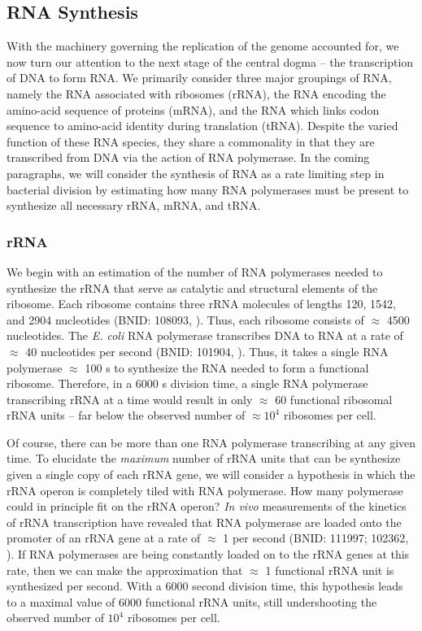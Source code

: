 \subsection{RNA Synthesis}
With the machinery governing the replication of the genome accounted for, we
now turn our attention to the next stage of the central dogma -- the
transcription of DNA to form RNA. We primarily consider three major groupings
of RNA, namely the RNA associated with ribosomes (rRNA), the RNA encoding the
amino-acid sequence of proteins (mRNA), and the RNA which links codon
sequence to amino-acid identity during translation (tRNA). Despite the varied
function of these RNA species, they share a commonality in that they are
transcribed from DNA via the action of RNA polymerase. In the coming
paragraphs, we will consider the synthesis of RNA as a rate limiting step in
bacterial division by estimating how many RNA polymerases must be present to
synthesize all necessary rRNA, mRNA, and tRNA.

\subsubsection{rRNA}
We begin with an estimation of the number of RNA polymerases needed to
synthesize the rRNA that serve as catalytic and structural elements of the
ribosome. Each ribosome contains three rRNA molecules of lengths 120, 1542,
and 2904 nucleotides (BNID: 108093, \cite{milo2010}). Thus, each ribosome
consists of $\approx$ 4500 nucleotides. The \textit{E. coli} RNA polymerase
transcribes DNA to RNA at a rate of $\approx$ 40 nucleotides per second
(BNID: 101904, \cite{milo2010}). Thus, it takes a single RNA polymerase
$\approx$ 100 s to synthesize the RNA needed to form a functional ribosome.
Therefore, in a 6000 s division time, a single RNA polymerase transcribing
rRNA at a time would result in only $\approx$ 60 functional ribosomal rRNA
units -- far below the observed number of $\approx 10^4$ ribosomes per cell.

Of course, there can be more than one RNA polymerase transcribing at any
given time. To elucidate the \textit{maximum} number of rRNA units that can
be synthesize given a single copy of each rRNA gene, we will consider a
hypothesis in which the rRNA operon is completely tiled with RNA polymerase.
How many polymerase could in principle fit on the rRNA operon? \textit{In
vivo} measurements of the kinetics of rRNA transcription have revealed that
RNA polymerase are loaded onto the promoter of an rRNA gene at a rate of
$\approx$ 1 per second (BNID: 111997; 102362, \cite{milo2010}). If RNA
polymerases are being constantly loaded on to the rRNA genes at this rate,
then we can make the approximation that $\approx$ 1 functional rRNA unit is
synthesized per second. With a 6000 second division time, this hypothesis
leads to a maximal value of 6000 functional rRNA units, still undershooting
the observed number of $10^4$ ribosomes per cell.

